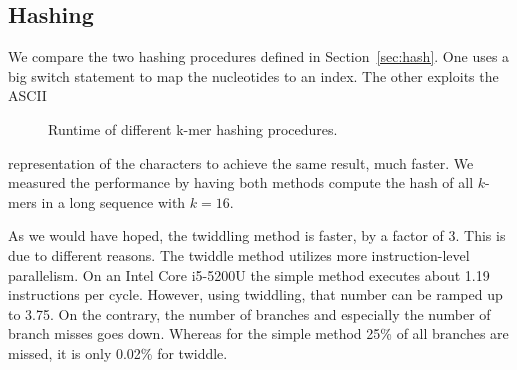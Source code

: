 \documentclass[10pt,letterpaper]{article}
\begin{document}
\vspace*{2cm}
\newpage{}
\subsection{Hashing}

We compare the two hashing procedures defined in Section~\ref{sec:hash}. One uses a big switch statement to map the nucleotides to an index. The other exploits the ASCII 

\begin{wrapfigure}[16]{r}{65mm}
    \caption{Runtime of different k-mer hashing procedures.}
\end{wrapfigure}
\noindent representation of the characters to achieve the same result, much faster. We measured the performance by having both methods compute the hash of all $k$-mers in a long sequence with $k = 16$.

As we would have hoped, the twiddling method is faster, by a factor of 3. This is due to different reasons. The twiddle method utilizes more instruction-level parallelism. On an Intel Core i5-5200U the simple method executes about 1.19 instructions per cycle. However, using twiddling, that number can be ramped up to 3.75. On the contrary, the number of branches and especially the number of branch misses goes down. Whereas for the simple method 25\% of all branches are missed, it is only 0.02\% for twiddle.
\end{document}
